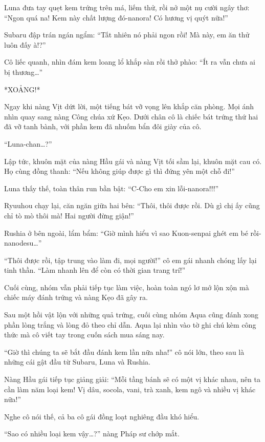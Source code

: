 \documentclass[../main.tex]{subfiles}
\begin{document}
Luna đưa tay quẹt kem trứng trên má, liếm thử, rồi nở một nụ cười ngây thơ: ``Ngon quá na! Kem này chất lượng đó-nanora! Có hương vị quýt nữa!''

Subaru đập trán ngán ngẩm: ``Tất nhiên nó phải ngon rồi! Mà này, em ăn thử luôn đấy à!?''

Cô liếc quanh, nhìn đám kem loang lổ khắp sàn rồi thở phào: ``Ít ra vẫn chưa ai bị thương\dots''

*XOẢNG!*

Ngay khi nàng Vịt dứt lời, một tiếng bát vỡ vọng lên khắp căn phòng. Mọi ánh nhìn quay sang nàng Công chúa xứ Kẹo. Dưới chân cô là chiếc bát trứng thứ hai đã vỡ tanh bành, với phần kem đã nhuốm bẩn đôi giày của cô.

``Luna-chan\dots?''

Lập tức, khuôn mặt của nàng Hầu gái và nàng Vịt tối sầm lại, khuôn mặt cau có. Họ cùng đồng thanh: ``Nếu không giúp được gì thì đứng yên một chỗ đi!''

Luna thấy thế, toàn thân run bần bật: ``C-Cho em xin lỗi-nanora!!!''

Ryuuhou chạy lại, căn ngăn giữa hai bên: ``Thôi, thôi được rồi. Dù gì chị ấy cũng chỉ tò mò thôi mà! Hai người đừng giận!''

Rushia ở bên ngoài, lẩm bẩm: ``Giờ mình hiểu vì sao Kuon-senpai ghét em bé rồi-nanodesu\dots''

``Thôi được rồi, tập trung vào làm đi, mọi người!'' cô em gái nhanh chóng lấy lại tinh thần. ``Làm nhanh lên để còn có thời gian trang trí!''

Cuối cùng, nhóm vẫn phải tiếp tục làm việc, hoàn toàn ngó lơ mớ lộn xộn mà chiếc máy đánh trứng và nàng Kẹo đã gây ra.

\ct

Sau một hồi vật lộn với những quả trứng, cuối cùng nhóm Aqua cũng đánh xong phần lòng trắng và lòng đỏ theo chỉ dẫn. Aqua lại nhìn vào tờ ghi chú kèm công thức mà cô viết tay trong cuốn sách mua sáng nay.

``Giờ thì chúng ta sẽ bắt đầu đánh kem lần nữa nha!'' cô nói lớn, theo sau là những cái gật đầu từ Subaru, Luna và Rushia.

Nàng Hầu gái tiếp tục giảng giải: ``Mỗi tầng bánh sẽ có một vị khác nhau, nên ta cần làm năm loại kem! Vị dâu, socola, vani, trà xanh, kem ngô và nhiều vị khác nữa!''

Nghe cô nói thế, cả ba cô gái đồng loạt nghiêng đầu khó hiểu.

``Sao có nhiều loại kem vậy\dots?'' nàng Pháp sư chớp mắt.
\end{document}

